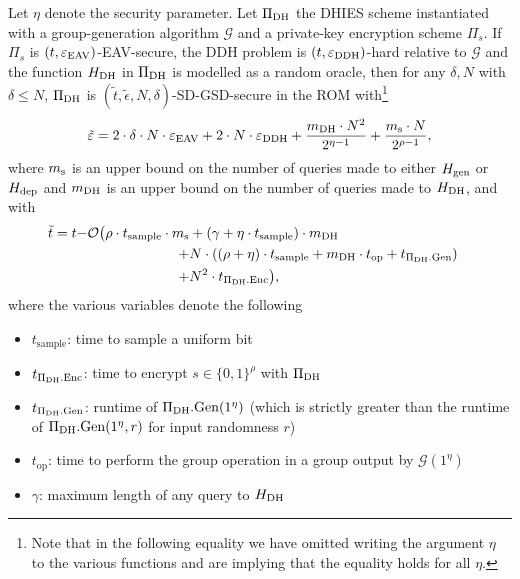 \begin{theorem} \label{theorem:sdgsd-security}
	Let $\eta$ denote the security parameter.
	Let $\Pi_{\mathrm{DH}}$ the DHIES scheme instantiated with a group-generation algorithm $\mathcal{G}$ and a private-key encryption scheme $\Pi_s$. If $\Pi_s$ is $(t, \varepsilon_\mathrm{EAV})$-EAV-secure, the DDH problem is $(t, \varepsilon_\mathrm{DDH})$-hard relative to $\mathcal{G}$ and the function $H_\mathrm{DH}$ in $\Pi_{\mathrm{DH}}$ is modelled as a random oracle, then for any $\delta, N$ with $\delta \le N$, $\Pi_{\mathrm{DH}}$ is $(\tilde{t}, \tilde{\epsilon}, N, \delta)$-SD-GSD-secure in the ROM with\footnote{Note that in the following equality we have omitted writing the argument $\eta$ to the various functions and are implying that the equality holds for all $\eta$.}
	\[
		\tilde{\varepsilon} = 2 \cdot \delta \cdot N \cdot \varepsilon_\mathrm{EAV} + 2 \cdot N \cdot \varepsilon_\mathrm{DDH} + \frac{m_\mathrm{DH} \cdot N^2}{2^{\eta - 1}} + \frac{m_\mathrm{s} \cdot N}{2^{\rho - 1}},
	\]
	where $m_\mathrm{s}$ is an upper bound on the number of queries made to either $H_\mathrm{gen}$ or $H_\mathrm{dep}$ and $m_\mathrm{DH}$ is an upper bound on the number of queries made to $H_\mathrm{DH}$, and with
	\[
		\tilde{t} = t \begin{aligned}[t]
			- & \mathcal{O}
			\begin{aligned}[t]
				\big(\rho \cdot t_{\mathrm{sample}} \cdot m_\mathrm{s} & + (\gamma + \eta \cdot t_{\mathrm{sample}}) \cdot m_\mathrm{DH} \\ + & N \cdot ((\rho + \eta) \cdot t_{\mathrm{sample}} + m_\mathrm{DH} \cdot t_{\mathrm{op}} + t_{\Pi_{\mathrm{DH}}.\mathrm{Gen}})  \\ + & N^2 \cdot t_{\Pi_{\mathrm{DH}}.\mathrm{Enc}}\big), \\
			\end{aligned}
		\end{aligned}
	\]
	where the various variables denote the following
	\begin{itemize}
		\item $t_{\mathrm{sample}}$: time to sample a uniform bit
		\item $t_{\Pi_{\mathrm{DH}}.\mathrm{Enc}}$: time to encrypt $s \in \{0, 1\}^\rho$ with $\Pi_{\mathrm{DH}}$
		\item $t_{\Pi_{\mathrm{DH}}.\mathrm{Gen}}$: runtime of $\Pi_{\mathrm{DH}}.\mathrm{Gen}(1^\eta)$ (which is strictly greater than the runtime of $\Pi_{\mathrm{DH}}.\mathrm{Gen}(1^\eta, r)$ for input randomness $r$)
		\item $t_{\mathrm{op}}$: time to perform the group operation in a group output by $\mathcal{G}(1^\eta)$
		\item $\gamma$: maximum length of any query to $H_\mathrm{DH}$
	\end{itemize}
\end{theorem}

